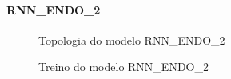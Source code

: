\documentclass[	12pt, Times, openright, twoside, a4paper, english, brazil]{abntex2}
\begin{document}
              \paragraph{RNN\_ENDO\_2}
                \begin{figure}[!ht]
                  \caption{Topologia do modelo RNN\_ENDO\_2 \label{fig:case1_rnn_endo2} }
                \end{figure}

                \begin{figure}[!ht]
                  \caption{Treino do modelo RNN\_ENDO\_2 \label{fig:case1_rnn_endo2_train} }
                \end{figure}
\end{document}
